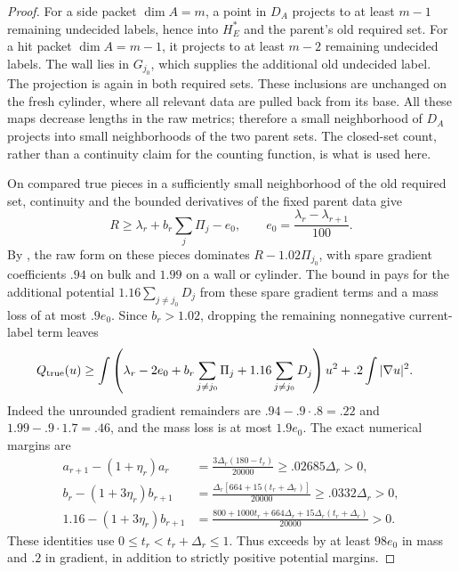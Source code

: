 \documentclass[11pt]{article}
\numberwithin{equation}{section}
\theoremstyle{definition}
\theoremstyle{remark}
\begin{document}
\begin{proof}
For a side packet $\dim A=m$, a point in $D_A$ projects to at least
$m-1$ remaining undecided labels, hence into $H_E^*$ and the parent's
old required set.  For a hit packet $\dim A=m-1$, it projects to at
least $m-2$ remaining undecided labels.  The wall lies in $G_{j_0}$,
which supplies the additional old undecided label.  The projection is
again in both required sets.  These inclusions are unchanged on the
fresh cylinder, where all relevant data are pulled back from its base.
All these maps decrease lengths in the raw metrics; therefore a small
neighborhood of $D_A$ projects into small neighborhoods of the two
parent sets.  The closed-set count, rather than a continuity claim for
the counting function, is what is used here.

On compared true pieces in a sufficiently small neighborhood of the
old required set, continuity and the bounded derivatives of the fixed
parent data give
\[
 R\ge\lambda_r+b_r\sum_j\Pi_j-e_0,
 \qquad e_0=\frac{\lambda_r-\lambda_{r+1}}{100}.
\]
By , the raw form on these pieces
dominates $R-1.02\Pi_{j_0}$, with spare gradient coefficients $.94$
on bulk and $1.99$ on a wall or cylinder.  The bound in
 pays for the additional potential
$1.16\sum_{j\ne j_0}D_j$ from these spare gradient terms and a mass
loss of at most $.9e_0$.  Since
$b_r>1.02$, dropping the remaining nonnegative current-label term
leaves
\begin{align}
 Q_{\rm true}(u)&\ge
 \int\left(\lambda_r-2e_0+
       b_r\sum_{j\ne j_0}\Pi_j+
       1.16\sum_{j\ne j_0}D_j\right)u^2
       +.2\int|\nabla u|^2.\label{regular:true-budget}
\end{align}
Indeed the unrounded gradient remainders are
$.94-.9\cdot.8=.22$ and $1.99-.9\cdot1.7=.46$, and the mass loss is
at most $1.9e_0$.  The exact numerical margins are
\begin{equation}\label{regular:eta}
\begin{aligned}
 a_{r+1}-(1+\eta_r)a_r
   &=\frac{3\Delta_r(180-t_r)}{20000}
     \ge .02685\Delta_r>0,\\
 b_r-(1+3\eta_r)b_{r+1}
   &=\frac{\Delta_r[664+15(t_r+\Delta_r)]}{20000}
     \ge .0332\Delta_r>0,\\
 1.16-(1+3\eta_r)b_{r+1}
   &=\frac{800+1000t_r+664\Delta_r+
                  15\Delta_r(t_r+\Delta_r)}{20000}>0.
\end{aligned}
\end{equation}
These identities use $0\le t_r<t_r+\Delta_r\le1$.  Thus
 exceeds
 by at least $98e_0$ in mass and $.2$ in
gradient, in addition to strictly positive potential margins.


\end{proof}
\end{document}
